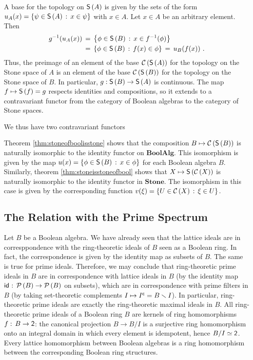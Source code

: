 A base for the topology on $\mathsf{S}\left(A\right)$ is given by the sets of the form
$u_{A}(x)=\{\psi\in\mathsf{S}\left(A\right)\,:\,x\in\psi\}$ with $x\in A$. Let $x\in A$
be an arbitrary element. Then
\begin{align*}
	g^{-1}(u_{A}(x)) & \,=\,\left\lbrace\phi\in\mathsf{S}\left(B\right)
		\,:\,x\in f^{-1}(\phi)\right\rbrace \\
	& \,=\,\left\lbrace\phi\in\mathsf{S}\left(B\right)
		\,:\,f(x)\in\phi\right\rbrace
		\,=\,u_{B}(f(x))
	\text{ .}
\end{align*}
%
Thus, the preimage of an element of the base $\mathcal{C}\left(\mathsf{S}\left(A\right)\right)$
for the topology on the Stone space of $A$ is an element of the base
$\mathcal{C}\left(\mathsf{S}\left(B\right)\right)$ for the topology on the Stone space of $B$.
In particular, $g:\mathsf{S}\left(B\right)\rightarrow\mathsf{S}\left(A\right)$ is continuous. The
map $f\mapsto\mathsf{S}\left(f\right)=g$ respects identities and compositions, so it
extends to a contravariant functor from the category of Boolean algebras to
the category of Stone spaces.

We thus have two contravariant functors
\begin{center}
\end{center}
%
Theorem \ref{thm:stoneofboolisstone} shows that the composition
$B\mapsto\mathcal{C}\left(\mathsf{S}\left(B\right)\right)$ is naturally isomorphic to the identity
functor on $\mathbf{BoolAlg}$. This isomorphism is given by the map
$u(x)=\{\phi\in\mathsf{S}\left(B\right)\,:\,x\in\phi\}$ for each Boolean algebra $B$.
Similarly, theorem \ref{thm:stoneisstoneofbool} shows that
$X\mapsto\mathsf{S}\left(\mathcal{C}\left(X\right)\right)$ is naturally isomorphic to the identity
functor in $\mathbf{Stone}$. The isomorphism in this case is given by the
corresponding function $v(\xi)=\{U\in\mathcal{C}\left(X\right)\,:\,\xi\in U\}$.

\subsection{The Relation with the Prime Spectrum}
Let $B$ be a Boolean algebra. We have already seen that the lattice
ideals are in corresppondence with the ring-theoretic ideals of $B$ seen
as a Boolean ring. In fact, the correspondence is given by the identity
map as subsets of $B$. The same is true for prime ideals. Therefore, we may
conclude that ring-theoretic prime ideals in $B$ are in correspondence with
lattice ideals in $B$ (by the identity map
$\mathsf{id}_{}:\,\mathcal{P}\left(B\right)\rightarrow\mathcal{P}\left(B\right)$ on subsets), which are in
correspondence with prime filters in $B$ (by taking set-theoretic complements
$I\mapsto{I}^{\mathsf{c}}=B\smallsetminus I$). In particular, ring-theoretic prime ideals
are exactly the ring-theoretic maximal ideals in $B$.
All ring-theoretic prime ideals of a Boolean ring $B$ are kernels of
ring homomorphisms $f:\,B\rightarrow\mathsf{2}$: the canonical projection
$B\rightarrow B/I$ is a surjective ring homomorphism onto an integral
domain in which every element is idempotent, hence $B/I\simeq\mathsf{2}$.
Every lattice homomorphism between Boolean algebras is a ring homomorphism
between the corresponding Boolean ring structures.

